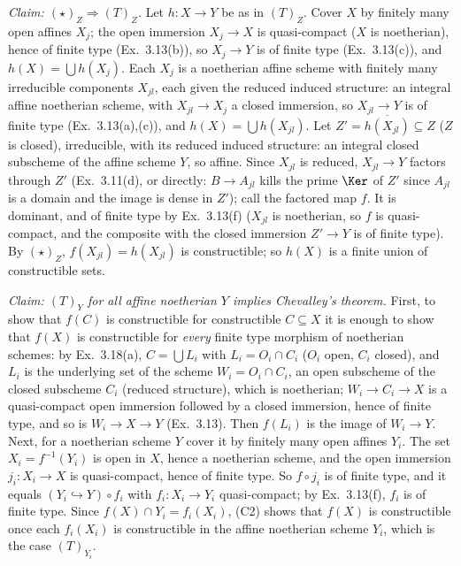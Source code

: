 \documentclass[11pt]{article}
\begin{document}
\emph{Claim: $(\star)_Z\Rightarrow(T)_Z$.} Let $h:X\to Y$ be as in $(T)_Z$. Cover $X$ by finitely many open affines $X_j$; the open immersion $X_j\to X$ is quasi-compact ($X$ is noetherian), hence of finite type (Ex.~3.13(b)), so $X_j\to Y$ is of finite type (Ex.~3.13(c)), and $h(X)=\bigcup h(X_j)$. Each $X_j$ is a noetherian affine scheme with finitely many irreducible components $X_{jl}$, each given the reduced induced structure: an integral affine noetherian scheme, with $X_{jl}\to X_j$ a closed immersion, so $X_{jl}\to Y$ is of finite type (Ex.~3.13(a),(c)), and $h(X)=\bigcup h(X_{jl})$. Let $Z'=\overline{h(X_{jl})}\subseteq Z$ ($Z$ is closed), irreducible, with its reduced induced structure: an integral closed subscheme of the affine scheme $Y$, so affine. Since $X_{jl}$ is reduced, $X_{jl}\to Y$ factors through $Z'$ (Ex.~3.11(d), or directly: $B\to A_{jl}$ kills the prime $\Ker$ of $Z'$ since $A_{jl}$ is a domain and the image is dense in $Z'$); call the factored map $f$. It is dominant, and of finite type by Ex.~3.13(f) ($X_{jl}$ is noetherian, so $f$ is quasi-compact, and the composite with the closed immersion $Z'\to Y$ is of finite type). By $(\star)_Z$, $f(X_{jl})=h(X_{jl})$ is constructible; so $h(X)$ is a finite union of constructible sets.

\emph{Claim: $(T)_Y$ for all affine noetherian $Y$ implies Chevalley's theorem.} First, to show that $f(C)$ is constructible for constructible $C\subseteq X$ it is enough to show that $f(X)$ is constructible for \emph{every} finite type morphism of noetherian schemes: by Ex.~3.18(a), $C=\bigcup L_i$ with $L_i=O_i\cap C_i$ ($O_i$ open, $C_i$ closed), and $L_i$ is the underlying set of the scheme $W_i=O_i\cap C_i$, an open subscheme of the closed subscheme $C_i$ (reduced structure), which is noetherian; $W_i\to C_i\to X$ is a quasi-compact open immersion followed by a closed immersion, hence of finite type, and so is $W_i\to X\to Y$ (Ex.~3.13). Then $f(L_i)$ is the image of $W_i\to Y$. Next, for a noetherian scheme $Y$ cover it by finitely many open affines $Y_i$. The set $X_i=f^{-1}(Y_i)$ is open in $X$, hence a noetherian scheme, and the open immersion $j_i:X_i\to X$ is quasi-compact, hence of finite type. So $f\circ j_i$ is of finite type, and it equals $(Y_i\hookrightarrow Y)\circ f_i$ with $f_i:X_i\to Y_i$ quasi-compact; by Ex.~3.13(f), $f_i$ is of finite type. Since $f(X)\cap Y_i=f_i(X_i)$, (C2) shows that $f(X)$ is constructible once each $f_i(X_i)$ is constructible in the affine noetherian scheme $Y_i$, which is the case $(T)_{Y_i}$.
\end{document}
